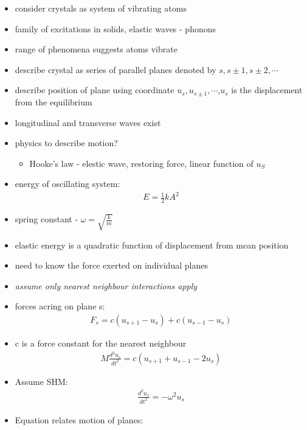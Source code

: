 \documentclass[a4paper,11pt,normalem]{article}
\begin{document}
\begin{itemize}
    \item consider crystals as system of vibrating atoms
    \item family of excitations in solids, elastic waves - phonons
    \item range of phenomena suggests atoms vibrate
    \item describe crystal as series of parallel planes denoted by \(s,s\pm1,s\pm2,\cdots\)
    \item describe position of plane using coordinate \(u_s,u_{s\pm1},\cdots\),\(u_s\) is the displacement from the equilibrium
    \item longitudinal and transverse waves exist
    \item physics to describe motion?
        \begin{itemize}
            \item Hooke's law - elestic wave, restoring force, linear function of \(u_S\)
        \end{itemize}
    \item energy of oscillating system:
        \begin{align*}
            E = \frac{1}{2}kA^2
        \end{align*}
    \item spring constant - \(\omega = \sqrt{\frac{k}{m}}\)
    \item elastic energy is a quadratic function of displacement from mean position
    \item need to know the force exerted on individual planes
    \item \emph{assume only nearest neighbour interactions apply}
    \item forces acring on plane s:
        \begin{align*}
            F_s = c(u_{s+1}-u_s) + c(u_{s-1}-u_s)
        \end{align*}
    \item c is a force constant for the nearest neighbour
        \begin{align*}
            M\frac{d^2u_s}{dt^2} = c(u_{s+1}+u_{s-1}-2u_s)
        \end{align*}
    \item Assume SHM:
        \begin{align*}
            \frac{d^2u_s}{dt^2} = -\omega^2u_s
        \end{align*}
    \item Equation relates motion of planes:
        \begin{align*}

\end{align*}
\end{itemize}
\end{document}
